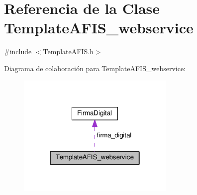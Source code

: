 \hypertarget{classTemplateAFIS__webservice}{}\section{Referencia de la Clase Template\+A\+F\+I\+S\+\_\+webservice}
\label{classTemplateAFIS__webservice}


{\ttfamily \#include $<$Template\+A\+F\+I\+S.\+h$>$}



Diagrama de colaboración para Template\+A\+F\+I\+S\+\_\+webservice\+:\nopagebreak
\begin{figure}[H]
\begin{center}
\leavevmode
\includegraphics[width=214pt]{classTemplateAFIS__webservice__coll__graph}
\end{center}
\end{figure}
